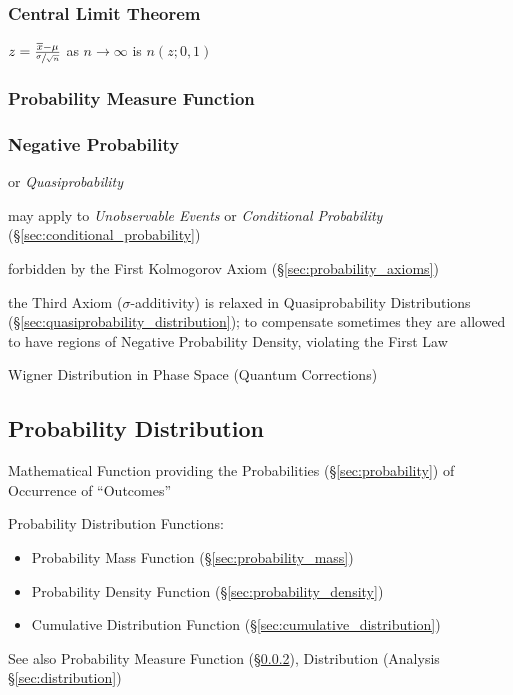 \subsubsection{Central Limit Theorem}\label{sec:central_limit}

$z = \frac{\overline{x} - \mu}{\sfrac{\sigma}{\sqrt{n}}}$ as $n
\rightarrow \infty$ is $n(z; 0,1)$ %



\subsubsection{Probability Measure Function}
\label{sec:probability_measure_function}

\subsubsection{Negative Probability}\label{sec:negative_probability}

or \emph{Quasiprobability}

may apply to \emph{Unobservable Events} or \emph{Conditional Probability}
(\S\ref{sec:conditional_probability})

forbidden by the First Kolmogorov Axiom (\S\ref{sec:probability_axioms})

the Third Axiom ($\sigma$-additivity) is relaxed in Quasiprobability
Distributions (\S\ref{sec:quasiprobability_distribution}); to compensate
sometimes they are allowed to have regions of Negative Probability Density,
violating the First Law

Wigner Distribution in Phase Space (Quantum Corrections)



\subsection{Probability Distribution}
\label{sec:probability_distribution}

Mathematical Function providing the Probabilities (\S\ref{sec:probability}) of
Occurrence of ``Outcomes''

Probability Distribution Functions:
\begin{itemize}
  \item Probability Mass Function (\S\ref{sec:probability_mass})
  \item Probability Density Function (\S\ref{sec:probability_density})
  \item Cumulative Distribution Function
    (\S\ref{sec:cumulative_distribution})
\end{itemize}
See also Probability Measure Function
(\S\ref{sec:probability_measure_function}), Distribution (Analysis
\S\ref{sec:distribution})

